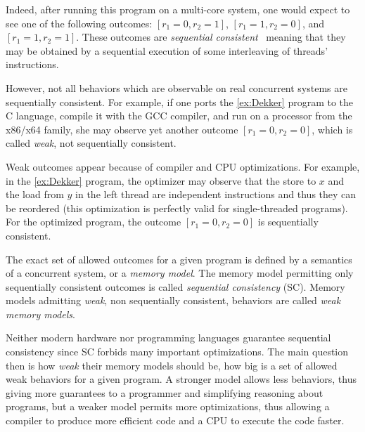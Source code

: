 Indeed, after running this program on a multi-core system, one would expect to see 
one of the following outcomes: $[r_1=0, r_2=1]$, $[r_1=1,r_2=0]$, and $[r_1=1,r_2=1]$.
These outcomes are \emph{sequential consistent}~\cite{Lamport:TC79} meaning
that they may be obtained by a sequential execution 
of some interleaving of threads' instructions. 



However, not all behaviors which are observable on real concurrent systems are sequentially consistent. 
For example, if one ports the \ref{ex:Dekker} program to the C language, compile it with the GCC compiler, 
and run on a processor from the x86/x64 family,
she may observe yet another outcome $[r_1=0, r_2=0]$,
which is called \emph{weak}, \ie not sequentially consistent.

Weak outcomes appear because of compiler and CPU optimizations.
For example, in the \ref{ex:Dekker} program,
the optimizer may observe that the store to $x$ and the load from $y$ in the left thread
are independent instructions and thus they can be reordered
(this optimization is perfectly valid for single-threaded programs).
For the optimized program, the outcome $[r_1=0, r_2=0]$
is sequentially consistent.

The exact set of allowed outcomes for a given program 
is defined by a semantics of a concurrent system, or a \emph{memory model}.
The memory model permitting only sequentially consistent outcomes 
is called \emph{sequential consistency} (SC).
Memory models admitting \emph{weak}, \ie non sequentially consistent, behaviors 
are called \emph{weak memory models}.

Neither modern hardware nor programming languages 
guarantee sequential consistency since SC forbids many important optimizations.
The main question then is how \emph{weak} their memory models should be,
\ie how big is a set of allowed weak behaviors for a given program.
A stronger model allows less behaviors, thus giving more guarantees to a programmer
and simplifying reasoning about programs, but a weaker model permits more optimizations,
thus allowing a compiler to produce more efficient code and a CPU to execute the code faster.

